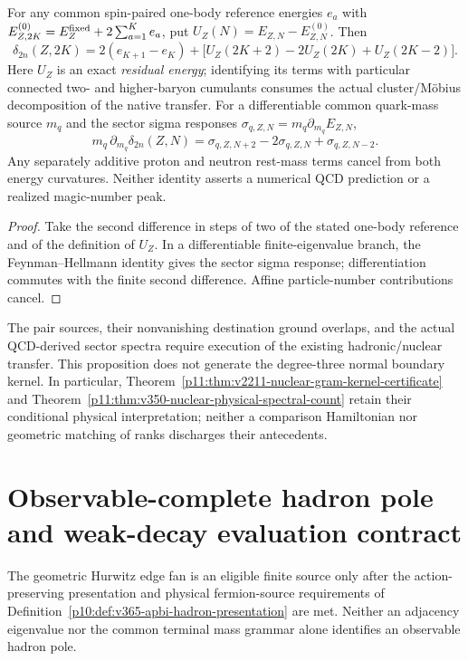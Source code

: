 \documentclass[12pt,a4paper]{article}
\begin{document}
\begin{proposition}
\label{p11:prop:v357-shell-gap-curvature-source}
For any common spin-paired one-body reference energies $e_a$ with
$E^{(0)}_{Z,2K}=E_Z^{\rm fixed}+2\sum_{a=1}^Ke_a$, put
$U_Z(N)=E_{Z,N}-E^{(0)}_{Z,N}$. Then
\[
 \boxed{\delta_{2n}(Z,2K)=2(e_{K+1}-e_K)
 +\bigl[U_Z(2K+2)-2U_Z(2K)+U_Z(2K-2)\bigr].}
\]
Here $U_Z$ is an exact \emph{residual energy}; identifying its terms
with particular connected two- and higher-baryon cumulants consumes
the actual cluster/M\"obius decomposition of the native transfer.
For a differentiable common quark-mass source $m_q$ and the
sector sigma responses $\sigma_{q,Z,N}=m_q\partial_{m_q}E_{Z,N}$,
\[
 \boxed{m_q\,\partial_{m_q}\delta_{2n}(Z,N)
 =\sigma_{q,Z,N+2}-2\sigma_{q,Z,N}+\sigma_{q,Z,N-2}.}
\]
Any separately additive proton and neutron rest-mass terms cancel
from both energy curvatures. Neither identity asserts a numerical
QCD prediction or a realized magic-number peak.
\end{proposition}
\begin{proof}
Take the second difference in steps of two of the stated one-body
reference and of the definition of $U_Z$. In a differentiable
finite-eigenvalue branch, the Feynman--Hellmann identity gives the
sector sigma response; differentiation commutes with the finite
second difference. Affine particle-number contributions cancel.
\end{proof}
\begin{remark}
\label{p11:rem:v357-nuclear-pair-scope}
The pair sources, their nonvanishing destination ground overlaps,
and the actual QCD-derived sector spectra require execution of the
existing hadronic/nuclear transfer. This proposition does not
generate the degree-three normal boundary kernel. In particular,
Theorem~\ref{p11:thm:v2211-nuclear-gram-kernel-certificate} and
Theorem~\ref{p11:thm:v350-nuclear-physical-spectral-count}
retain their conditional physical interpretation; neither a
comparison Hamiltonian nor geometric matching of ranks discharges
their antecedents.
\end{remark}


\section{Observable-complete hadron pole and weak-decay evaluation contract}
\label{p11:sec:v365-hurwitz-decay-test}
The geometric Hurwitz edge fan is an eligible finite source only
after the action-preserving presentation and physical fermion-source
requirements of Definition~\ref{p10:def:v365-apbi-hadron-presentation}
are met.  Neither an adjacency eigenvalue nor the common terminal
mass grammar alone identifies an observable hadron pole.
\end{document}
